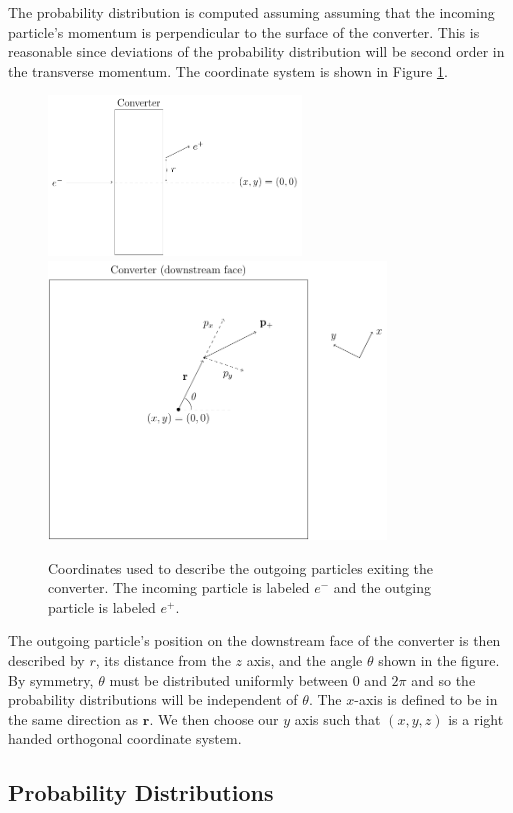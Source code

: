 \documentclass[12pt]{article}
\newcommand{\rrr}{\mathbf{r}}
\begin{document}
The probability distribution is computed assuming assuming that the incoming particle's momentum is
perpendicular to the surface of the converter. This is reasonable since deviations of the
probability distribution will be second order in the transverse momentum. The coordinate system is
shown in Figure \ref{fig:coords}.
\begin{figure}
\centering
\includegraphics[width=0.6\textwidth]{coords1.pdf}
\includegraphics[width=0.8\textwidth]{coords2.pdf}
\caption{Coordinates used to describe the outgoing particles exiting the converter. The incoming particle is 
labeled $e^-$ and the outging particle is labeled $e^+$.}
\label{fig:coords}
\end{figure}
The outgoing particle's position on the downstream face of the converter is then described by $r$,
its distance from the $z$ axis, and the angle $\theta$ shown in the figure. By symmetry, $\theta$
must be distributed uniformly between $0$ and $2\pi$ and so the probability distributions will be
independent of $\theta$. The $x$-axis is defined to be in the same direction as $\rrr$. We then
choose our $y$ axis such that $(x,y,z)$ is a right handed orthogonal coordinate system.

\subsection{Probability Distributions}
\end{document}
